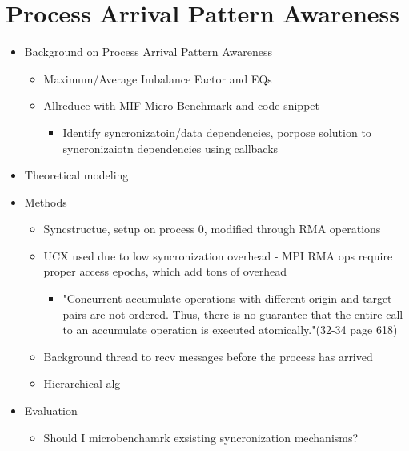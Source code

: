 
\glsresetall %
\chapter[PAPAwareness]{Process Arrival Pattern Awareness}\label{ch:PAPAwareness}

\begin{itemize}
    \item Background on Process Arrival Pattern Awareness
    \begin{itemize}
        \item Maximum/Average Imbalance Factor and EQs
        \item Allreduce with MIF Micro-Benchmark and code-snippet
        \begin{itemize}
            \item Identify syncronizatoin/data dependencies, porpose solution to syncronizaiotn dependencies using callbacks \cite{Luo2018ADAPT}
        \end{itemize}
    \end{itemize}
    \item Theoretical modeling
    \item Methods
    \begin{itemize}
        \item Syncstructue, setup on process 0, modified through RMA operations
        \item UCX used due to low syncronization overhead - MPI RMA ops require proper access epochs, which add tons of overhead
        \begin{itemize}
            \item "Concurrent accumulate operations with different origin and target pairs are
not ordered. Thus, there is no guarantee that the entire call to an accumulate operation is
executed atomically."(32-34 page 618)
        \end{itemize}
        \item Background thread to recv messages before the process has arrived 
        \item Hierarchical alg 
    \end{itemize}
    \item Evaluation
    \begin{itemize}
        \item Should I microbenchamrk exsisting syncronization mechanisms?

\end{itemize}
\end{itemize}
